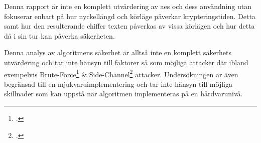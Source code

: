 Denna rapport är inte en komplett utvärdering av \acrshort{aes} och dess användning utan fokuserar
enbart på hur nyckellängd och körläge påverkar krypteringstiden. Detta samt hur den resulterande
chiffer texten påverkas av vissa körlägen och hur detta då i sin tur kan påverka säkerheten. \par

Denna analys av algoritmens säkerhet är alltså inte en komplett säkerhets utvärdering och tar inte
hänsyn till faktorer så som möjliga attacker där ibland exempelvis Brute-Force\footcite{kumar2011investigations}
\& Side-Channel\footcite{10.1007/978-3-642-04138-9_8} attacker. Undersökningen är även
begränsad till en mjukvaruimplementering och tar inte hänsyn till möjliga skillnader som kan uppstå
när algoritmen implementeras på en hårdvarunivå.